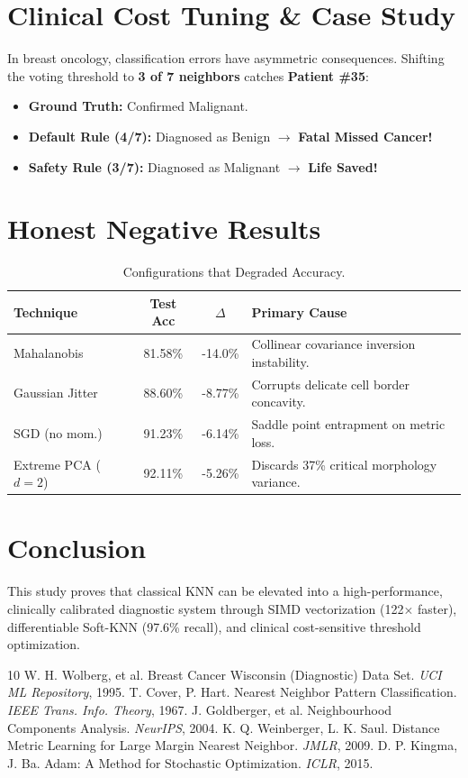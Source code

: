\documentclass[10pt,twocolumn,letterpaper]{article}
\begin{document}
\section{Clinical Cost Tuning \& Case Study}
In breast oncology, classification errors have asymmetric consequences. Shifting the voting threshold to \textbf{3 of 7 neighbors} catches \textbf{Patient \#35}:
\begin{itemize}
\item \textbf{Ground Truth:} Confirmed Malignant.
\item \textbf{Default Rule (4/7):} Diagnosed as Benign $\to$ \textbf{Fatal Missed Cancer!}
\item \textbf{Safety Rule (3/7):} Diagnosed as Malignant $\to$ \textbf{Life Saved!}
\end{itemize}

\section{Honest Negative Results}
\begin{table}[h]
\centering
\caption{Configurations that Degraded Accuracy.}
\small
\begin{tabular}{lccl}
\toprule
Technique & Test Acc & $\Delta$ & Primary Cause \\
\midrule
Mahalanobis & 81.58\% & -14.0\% & Collinear covariance inversion instability. \\
Gaussian Jitter & 88.60\% & -8.77\% & Corrupts delicate cell border concavity. \\
SGD (no mom.) & 91.23\% & -6.14\% & Saddle point entrapment on metric loss. \\
Extreme PCA ($d=2$) & 92.11\% & -5.26\% & Discards 37\% critical morphology variance. \\
\bottomrule
\end{tabular}
\end{table}

\section{Conclusion}
This study proves that classical KNN can be elevated into a high-performance, clinically calibrated diagnostic system through SIMD vectorization (122$\times$ faster), differentiable Soft-KNN (97.6\% recall), and clinical cost-sensitive threshold optimization.

\begin{thebibliography}{10}
 W. H. Wolberg, et al. Breast Cancer Wisconsin (Diagnostic) Data Set. \textit{UCI ML Repository}, 1995.
 T. Cover, P. Hart. Nearest Neighbor Pattern Classification. \textit{IEEE Trans. Info. Theory}, 1967.
 J. Goldberger, et al. Neighbourhood Components Analysis. \textit{NeurIPS}, 2004.
 K. Q. Weinberger, L. K. Saul. Distance Metric Learning for Large Margin Nearest Neighbor. \textit{JMLR}, 2009.
 D. P. Kingma, J. Ba. Adam: A Method for Stochastic Optimization. \textit{ICLR}, 2015.
\end{thebibliography}
\end{document}
